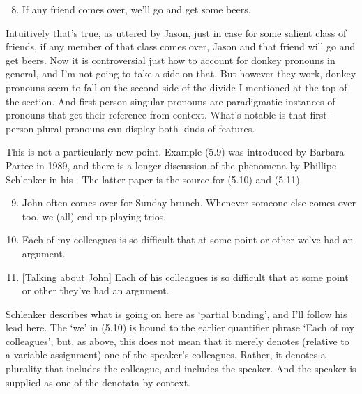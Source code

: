 \renewcommand{\labelenumi}{(5.\arabic{enumi})}
\begin{enumerate}
\setcounter{enumi}{7}
\item If any friend comes over, we'll go and get some beers.
\end{enumerate}

\noindent Intuitively that's true, as uttered by Jason, just in case for some salient class of friends, if any member of that class comes over, Jason and that friend will go and get beers. Now it is controversial just how to account for donkey pronouns in general, and I'm not going to take a side on that. But however they work, donkey pronouns seem to fall on the second side of the divide I mentioned at the top of the section. And first person singular pronouns are paradigmatic instances of pronouns that get their reference from context. What's notable is that first-person plural pronouns can display both kinds of features.

This is not a particularly new point. Example (5.9) was introduced by Barbara Partee in 1989, and there is a longer discussion of the phenomena by Phillipe Schlenker in his \citeyearpar{Schlenker2003}. The latter paper is the source for (5.10) and (5.11).

\renewcommand{\labelenumi}{(5.\arabic{enumi})}
\begin{enumerate}
\setcounter{enumi}{8}
\item John often comes over for Sunday brunch. Whenever someone else comes over too, we (all) end up playing trios. \citet{Partee1989}

\item Each of my colleagues is so difficult that at some point or other we've had an argument. \citet{Schlenker2003}

\item {}[Talking about John] Each of his colleagues is so difficult that at some point or other they've had an argument. \citet{Schlenker2003}
\end{enumerate}

\noindent Schlenker describes what is going on here as `partial binding', and I'll follow his lead here. The `we' in (5.10) is bound to the earlier quantifier phrase `Each of my colleagues', but, as above, this does not mean that it merely denotes (relative to a variable assignment) one of the speaker's colleagues. Rather, it denotes a plurality that includes the colleague, and includes the speaker. And the speaker is supplied as one of the denotata by context.

